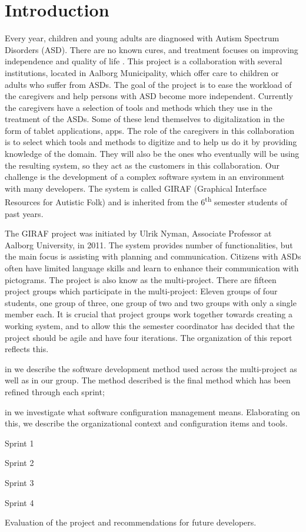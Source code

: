 \chapter{Introduction}
Every year, children and young adults are diagnosed with Autism Spectrum Disorders (ASD). There are no known cures, and treatment focuses on improving independence and quality of life \cite{Myers01112007}. This project is a collaboration with several institutions, located in Aalborg Municipality, which offer care to children or adults who suffer from ASDs. The goal of the project is to ease the workload of the caregivers and help persons with ASD become more independent. Currently the caregivers have a selection of tools and methods which they use in the treatment of the ASDs. Some of these lend themselves to digitalization in the form of tablet applications, apps. The role of the caregivers in this collaboration is to select which tools and methods to digitize and to help us do it by providing knowledge of the domain. They will also be the ones who eventually will be using the resulting system, so they act as the customers in this collaboration. Our challenge is the development of a complex software system in an environment with many developers. The system is called GIRAF (Graphical Interface Resources for Autistic Folk) and is inherited from the 6\textsuperscript{th} semester students of past years.

The GIRAF project was initiated by Ulrik Nyman, Associate Professor at Aalborg University, in 2011. The system provides number of functionalities, but the main focus is assisting with planning and communication. Citizens with ASDs often have limited language skills and learn to enhance their communication with pictograms. The project is also know as the multi-project. There are fifteen project groups which participate in the multi-project: Eleven groups of four students, one group of three, one group of two and two groups with only a single member each. It is crucial that project groups work together towards creating a working system, and to allow this the semester coordinator has decided that the project should be agile and have four iterations. The organization of this report reflects this.

\begin{documentorganization}
    \item in  we describe the software development method used across the multi-project as well as in our group. The method described is the final method which has been refined through each sprint;
    \item in  we investigate what software configuration management means. Elaborating on this, we describe the organizational context and configuration items and tools.
    \item Sprint 1 
    \item Sprint 2
    \item Sprint 3
    \item Sprint 4
    \item Evaluation of the project and recommendations for future developers. 
\end{documentorganization}

